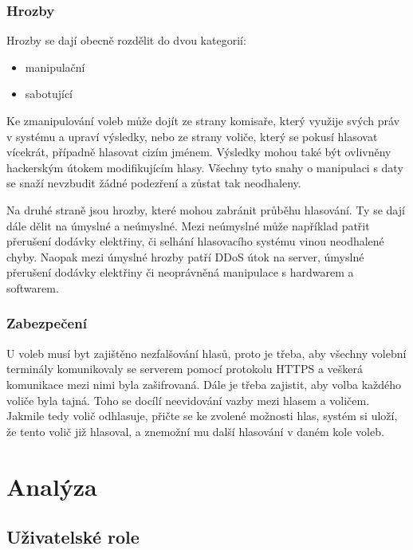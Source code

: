 \documentclass[11pt,twoside,a4paper]{book}
\begin{document}
\subsection{Hrozby}

Hrozby se dají obecně rozdělit do dvou kategorií: 

\begin{itemize}
	\item manipulační
	\item sabotující
\end{itemize}	

Ke zmanipulování voleb může dojít ze strany komisaře, který využije svých práv v systému a upraví výsledky, nebo ze strany voliče, který se pokusí hlasovat vícekrát, případně hlasovat cizím jménem. Výsledky mohou také být ovlivněny hackerským útokem modifikujícím hlasy. Všechny tyto snahy o manipulaci s daty se snaží nevzbudit žádné podezření a zůstat tak neodhaleny. 

Na druhé straně jsou hrozby, které mohou zabránit průběhu hlasování. Ty se dají dále dělit na úmyslné a neúmyslné. Mezi neúmyslné může například patřit přerušení dodávky elektřiny, či selhání hlasovacího systému vinou neodhalené chyby. Naopak mezi úmyslné hrozby patří DDoS útok \cite{www:ddos} na server, úmyslné přerušení dodávky elektřiny či neoprávněná manipulace s hardwarem a softwarem.

\subsection{Zabezpečení}

U voleb musí byt zajištěno nezfalšování hlasů, proto je třeba, aby všechny volební terminály komunikovaly se serverem pomocí protokolu HTTPS a veškerá komunikace mezi nimi byla zašifrovaná. Dále je třeba zajistit, aby volba každého voliče byla tajná. Toho se docílí neevidování vazby mezi hlasem a voličem. Jakmile tedy volič odhlasuje, přičte se ke zvolené možnosti hlas, systém si uloží, že tento volič již hlasoval, a znemožní mu další hlasování v daném kole voleb.

\chapter{Analýza}

\section{Uživatelské role}
\end{document}

